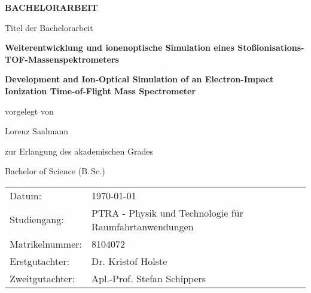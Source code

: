 {%
\pagestyle{empty}
\sffamily


\vfill
{\bfseries\Huge BACHELORARBEIT}

\vfill
Titel der Bachelorarbeit

{\LARGE\bfseries Weiterentwicklung und ionenoptische Simulation eines Stoßionisations-TOF-Massenspektrometers}
\vfill

{\Large\bfseries Development and Ion-Optical Simulation of an
Electron-Impact Ionization Time-of-Flight Mass
Spectrometer}
\vfill

vorgelegt von

{\Large Lorenz Saalmann}

\vspace{15mm}

zur Erlangung des akademischen Grades

{\Large Bachelor of Science (B.\,Sc.)}
\vfill


\vspace{15mm}

\raggedright
\begin{tabular}{p{}p{}}
Datum:          & \today \\[1.0ex]
Studiengang:    &  PTRA - Physik und Technologie f\"{u}r Raumfahrtanwendungen\\[1.0ex]
Matrikelnummer: &  8104072\\[1.0ex]
Erstgutachter:  &  Dr. Kristof Holste \\[1.0ex]
Zweitgutachter: &  Apl.-Prof. Stefan Schippers \\
\end{tabular}
\cleardoublepage
}%